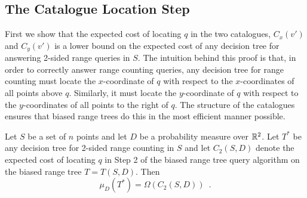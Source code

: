 \documentclass{patmorin}
\begin{document}
\subsection{The Catalogue Location Step}

First we show that the expected cost of locating $q$ in the two
catalogues, $C_x(v')$ and $C_y(v')$ is
a lower bound on the expected cost of any decision tree for answering
2-sided range queries in $S$.  The intuition behind this proof is
that, in order to correctly answer range counting queries, any decision tree
for range counting must locate the $x$-coordinate of $q$
with respect to the $x$-coordinates of all points above $q$.  
Similarly, it must locate the $y$-coordinate of $q$ with respect to
the $y$-coordinates of all points to the right of $q$.  The structure
of the catalogues ensures that biased range trees do this in the most
efficient manner possible.
 

\begin{lem}
Let $S$ be a set of $n$ points and let $D$ be a probability measure
over $\mathbb{R}^2$.
Let $T^*$ be any decision tree for 2-sided range counting in $S$ and let
$C_2(S,D)$ denote the expected cost of locating $q$ in Step 2 of the
biased range tree query algorithm on the biased range tree $T=T(S,D)$. 
Then
\[
  \mu_D(T^*) = \Omega(C_2(S,D)) \enspace .
\] 
\end{lem}
\end{document}
